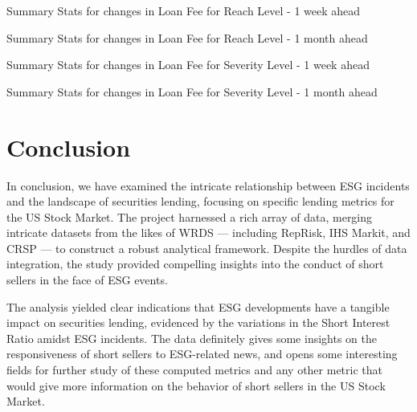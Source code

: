 \begin{table}[H]
\caption{Summary Stats for changes in Loan Fee for Reach Level - 1 week ahead}
\centering
\resizebox{\textwidth}{!}{

}
\label{table:loan_fee_reach_change_5.tex}
\end{table}

\begin{table}[H]
\caption{Summary Stats for changes in Loan Fee for Reach Level - 1 month ahead}
\centering
\resizebox{\textwidth}{!}{

}
\label{table:loan_fee_reach_change_26.tex}
\end{table}

\begin{table}[H]
\caption{Summary Stats for changes in Loan Fee for Severity Level - 1 week ahead}
\centering
\resizebox{\textwidth}{!}{

}
\label{table:loan_fee_severity_change_5.tex}
\end{table}

\begin{table}[H]
\caption{Summary Stats for changes in Loan Fee for Severity Level - 1 month ahead}
\centering
\resizebox{\textwidth}{!}{

}
\label{table:loan_fee_severity_change_26.tex}
\end{table}


\doublespacing
\section{Conclusion}

In conclusion, we have examined the intricate relationship between ESG incidents and the landscape of securities lending, focusing on specific lending metrics for the US Stock Market. The project harnessed a rich array of data, merging intricate datasets from the likes of WRDS — including RepRisk, IHS Markit, and CRSP — to construct a robust analytical framework. Despite the hurdles of data integration, the study provided compelling insights into the conduct of short sellers in the face of ESG events.

The analysis yielded clear indications that ESG developments have a tangible impact on securities lending, evidenced by the variations in the Short Interest Ratio amidst ESG incidents. The data definitely gives some insights on the responsiveness of short sellers to ESG-related news, and opens some interesting fields for further study of these computed metrics and any other metric that would give more information on the behavior of short sellers in the US Stock Market.

